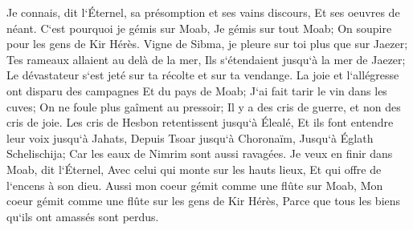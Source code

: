 \verse Je connais, dit l`Éternel, sa présomption et ses vains discours, Et ses oeuvres de néant. 
\verse C`est pourquoi je gémis sur Moab, Je gémis sur tout Moab; On soupire pour les gens de Kir Hérès. 
\verse Vigne de Sibma, je pleure sur toi plus que sur Jaezer; Tes rameaux allaient au delà de la mer, Ils s`étendaient jusqu`à la mer de Jaezer; Le dévastateur s`est jeté sur ta récolte et sur ta vendange. 
\verse La joie et l`allégresse ont disparu des campagnes Et du pays de Moab; J`ai fait tarir le vin dans les cuves; On ne foule plus gaîment au pressoir; Il y a des cris de guerre, et non des cris de joie. 
\verse Les cris de Hesbon retentissent jusqu`à Élealé, Et ils font entendre leur voix jusqu`à Jahats, Depuis Tsoar jusqu`à Choronaïm, Jusqu`à Églath Schelischija; Car les eaux de Nimrim sont aussi ravagées. 
\verse Je veux en finir dans Moab, dit l`Éternel, Avec celui qui monte sur les hauts lieux, Et qui offre de l`encens à son dieu. 
\verse Aussi mon coeur gémit comme une flûte sur Moab, Mon coeur gémit comme une flûte sur les gens de Kir Hérès, Parce que tous les biens qu`ils ont amassés sont perdus. 
